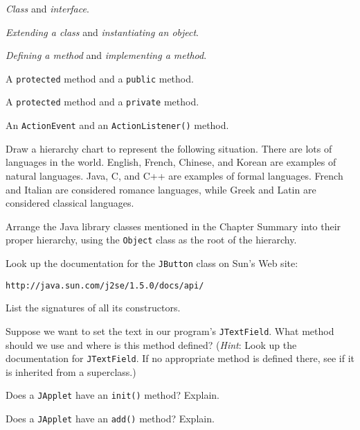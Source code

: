 \begin{EXRtwo}
\begin{EXRtwoLL}
\item  {\it Class} and {\it interface}.
\item  {\it Extending a class} and {\it instantiating an object}.
\item  {\it Defining a method} and {\it implementing a method}.
\item  A {\tt protected} method and a {\tt public} method.
\item  A {\tt protected} method and a {\tt private} method.
\item  An {\tt ActionEvent} and an {\tt ActionListener()} method.
\end{EXRtwoLL}


\item  Draw a hierarchy chart to represent the following situation.
There are lots of languages in the world.  English, French, Chinese,
and Korean are examples of natural languages.  Java, C, and C++ are
examples of formal languages.  French and Italian are considered
romance languages, while Greek and Latin are considered classical
languages.

\item  Arrange the Java library classes mentioned in the
Chapter Summary into their proper hierarchy, using the
{\tt Object} class as the root of the hierarchy.

\item  Look up the documentation for the {\tt JButton} class
on Sun's Web site:

\begin{jjjlisting}
\begin{lstlisting}[commentstyle=\color{black}]
http://java.sun.com/j2se/1.5.0/docs/api/
\end{lstlisting}
\end{jjjlisting}

\noindent List the signatures of all its constructors.

\item  Suppose we want to set the text in our program's {\tt JTextField}.
What method should we use and where is this method defined? ({\it Hint}:
Look up the documentation for {\tt JTextField}. If no appropriate
method is defined there, see if it is inherited from a superclass.)

\item  Does a {\tt JApplet} have an {\tt init()} method? Explain.

\item  Does a {\tt JApplet} have an {\tt add()} method? Explain.


\end{EXRtwo}
